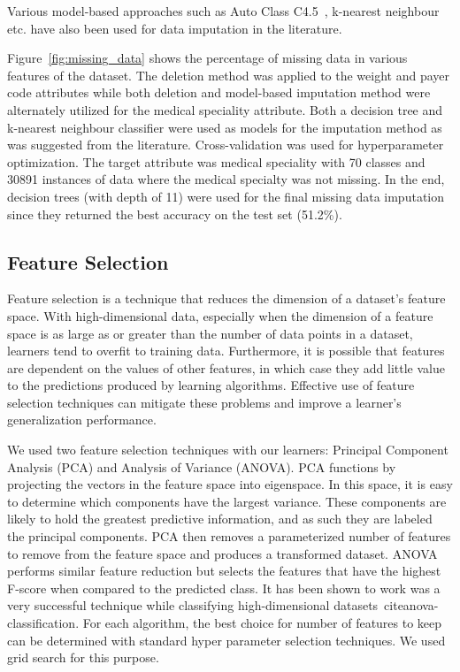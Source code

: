 \documentclass[conference]{IEEEtran}
\begin{document}
Various model-based approaches such as Auto Class C4.5~\cite{lakshminarayan-1999}, k-nearest neighbour~\cite{gustavo-2003} etc. have also been used for data imputation in the literature. 

Figure~\ref{fig:missing_data} shows the percentage of missing data in various features of the dataset. The deletion method was applied to the weight and payer code attributes while both deletion and model-based imputation method were alternately utilized for the medical speciality attribute. Both a decision tree  and k-nearest neighbour classifier were used as models for the imputation method as was suggested from the literature. Cross-validation was used for hyperparameter optimization. The target attribute was medical speciality with 70 classes and 30891 instances of data where the medical specialty was not missing. In the end, decision trees (with depth of 11) were used for the final missing data imputation since they returned the best accuracy on the test set (51.2\%).

\subsection{Feature Selection}
Feature selection is a technique that reduces the dimension of a dataset's feature space. With high-dimensional data, especially when the dimension of a feature space is as large as or greater than the number of data points in a dataset, learners tend to overfit to training data. Furthermore, it is possible that features are dependent on the values of other features, in which case they add little value to the predictions produced by learning algorithms. Effective use of feature selection techniques can mitigate these problems and improve a learner's generalization performance. 

We used two feature selection techniques with our learners: Principal Component Analysis (PCA) and Analysis of Variance (ANOVA). PCA functions by projecting the vectors in the feature space into eigenspace. In this space, it is easy to determine which components have the largest variance. These components are likely to hold the greatest predictive information, and as such they are labeled the principal components. PCA then removes a parameterized number of features to remove from the feature space and produces a transformed dataset. ANOVA performs similar feature reduction but selects the features that have the highest F-score when compared to the predicted class. It has been shown to work was a very successful technique while classifying high-dimensional datasets~cite{anova-classification}. For each algorithm, the best choice for number of features to keep can be determined with standard hyper parameter selection techniques. We used grid search for this purpose.
\end{document}
